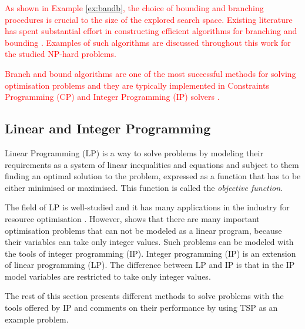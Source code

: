 \documentclass{mprop}
\theoremstyle{definition}
\begin{document}
\textcolor{red}{
As shown in Example \ref{ex:bandb}, the choice of bounding and branching procedures is crucial to the size of the explored search space. Existing literature has spent substantial effort in constructing efficient algorithms for branching and bounding \citep{Little63,Dantzig54, HeldK70}. Examples of such algorithms are discussed throughout this work for the studied NP-hard problems.}


\textcolor{red}{
Branch and bound algorithms are one of the most successful methods for solving optimisation problems \citep{Christofides81} and they are typically implemented in Constraints Programming (CP) and Integer Programming (IP) solvers \citep{Leyffer01,Quesada92}.}

\subsection{Linear and Integer Programming}
\label{ip}

Linear Programming (LP) is a way to solve problems by modeling their requirements as a system of linear inequalities and equations and subject to them finding an optimal solution to the problem, expressed as a function that has to be either minimised or maximised. This function is called the \textit{objective function}.

The field of LP is well-studied \citep{Kantorovich60,DantzigLp63} and it has many applications in the industry for resource optimisation \citep{Jacovkis89,Garvin57}. However, \citet{Dantzig60} shows that there are many important optimisation problems that can not be modeled as a linear program, because their variables can take only integer values. Such problems can be modeled with the tools of integer programming (IP). Integer programming (IP) is an extension of linear programming (LP). The difference between LP and IP is that in the IP model variables are restricted to take only integer values.

The rest of this section presents different methods to solve problems with the tools offered by IP and comments on their performance by using TSP as an example problem.
\end{document}
